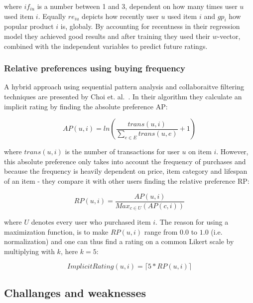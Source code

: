 where $if_{iu}$ is a number between 1 and 3, dependent on how many times user
$u$ used item $i$. Equally $re_{iu}$ depicts how recently user $u$ used item
$i$ and $gp_{i}$ how popular product $i$ is, globaly. By accounting for
recentness in their regression model they achieved good results and after
training they used their $w$-vector, combined with the independent variables to
predict future ratings. 

\subsubsection{Relative preferences using buying frequency}

A hybrid approach using sequential pattern analysis and collaboraitve filtering
techniques are presented by Choi et. al. \cite{choi2012hybrid}. In their
algorithm they calculate an implicit rating by finding the absolute preference
AP:

\begin{equation}
  AP(u,i) = ln(\frac{trans(u,i)}{\sum_{e \in E}{trans(u, e)}} + 1)
\end{equation}

where $trans(u,i)$ is the number of transactions for user $u$ on item $i$.
However, this absolute preference only takes into account the frequency of
purchases and because the frequency is heavily dependent on price, item
category and lifespan of an item - they compare it with other users finding the
relative preference RP:

\begin{equation}
  RP(u,i) = \frac{AP(u,i)}{Max_{c \in U}(AP(c,i))}
\end{equation}

where $U$ denotes every user who purchased item $i$. The reason for using a
maximization function, is to make $RP(u,i)$ range from $0.0$ to $1.0$ (i.e.
normalization) and one can thus find a rating on a common Likert scale by
multiplying with $k$, here $k=5$:

\begin{equation}
  ImplicitRating(u,i) = \lceil 5 * RP(u,i) \rceil
\end{equation}


\subsection{Challanges and weaknesses}
\label{implicit-weaknesses}


